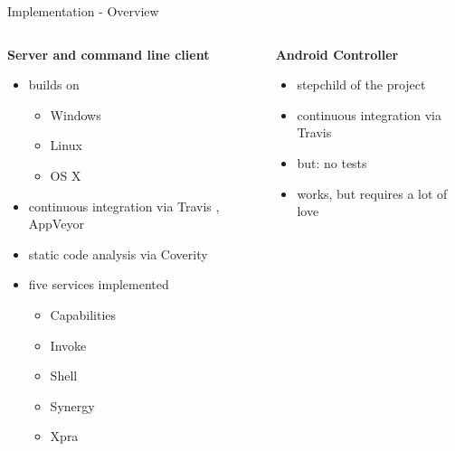 \documentclass[a4paper]{beamer}
\begin{document}
\begin{frame}{Implementation - Overview}
    \begin{columns}[t]
        \begin{column}{0.48\textwidth}
            \textbf{Server and command line client}

            \begin{itemize}
                \item builds on
                    \begin{itemize}
                        \item Windows
                        \item Linux
                        \item OS X
                    \end{itemize}
                \item continuous integration via Travis \cite{travis}, AppVeyor \cite{appveyor}
                \item static code analysis via Coverity \cite{coverity}
                \item five services implemented
                    \begin{itemize}
                        \item Capabilities
                        \item Invoke
                        \item Shell
                        \item Synergy
                        \item Xpra
                    \end{itemize}
            \end{itemize}
        \end{column}
        \begin{column}{0.48\textwidth}
            \textbf{Android Controller}

            \begin{itemize}
                \item stepchild of the project
                \item continuous integration via Travis
                \item but: no tests
                \item works, but requires a lot of love
            \end{itemize}
        \end{column}
    \end{columns}
\end{frame}
\end{document}

